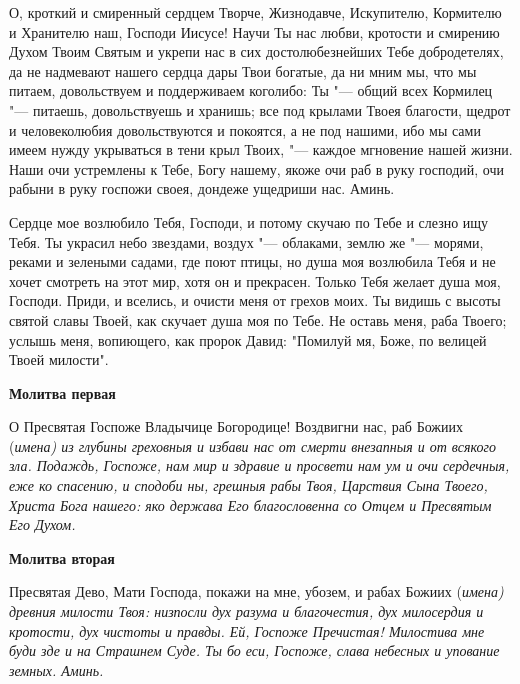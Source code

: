 О, кроткий и смиренный сердцем Творче, Жизнодавче, Искупителю, Кормителю и Хранителю наш, Господи Иисусе! Научи Ты нас любви, кротости и смирению Духом Твоим Святым и укрепи нас в сих достолюбезнейших Тебе добродетелях, да не надмевают нашего сердца дары Твои богатые, да ни мним мы, что мы питаем, довольствуем и поддерживаем коголибо: Ты "--- общий всех Кормилец "--- питаешь, довольствуешь и хранишь; все под крылами Твоея благости, щедрот и человеколюбия довольствуются и покоятся, а не под нашими, ибо мы сами имеем нужду укрываться в тени крыл Твоих, "--- каждое мгновение нашей жизни. Наши очи устремлены к Тебе, Богу нашему, якоже очи раб в руку господий, очи рабыни в руку госпожи своея, дондеже ущедриши нас. Аминь.


\mychapterending




Сердце мое возлюбило Тебя, Господи, и потому скучаю по Тебе и слезно ищу Тебя. Ты украсил небо звездами, воздух "--- облаками, землю же "--- морями, реками и зелеными садами, где поют птицы, но душа моя возлюбила Тебя и не хочет смотреть на этот мир, хотя он и прекрасен. Только Тебя желает душа моя, Господи. Приди, и вселись, и очисти меня от грехов моих. Ты видишь с высоты святой славы Твоей, как скучает душа моя по Тебе. Не оставь меня, раба Твоего; услышь меня, вопиющего, как пророк Давид: "Помилуй мя, Боже, по велицей Твоей милости".


\mychapterending




\bfseries Молитва первая\normalfont{}


О Пресвятая Госпоже Владычице Богородице! Воздвигни нас, раб Божиих (\itshape имена\normalfont{}) из глубины греховныя и избави нас от смерти внезапныя и от всякого зла. Подаждь, Госпоже, нам мир и здравие и просвети нам ум и очи сердечныя, еже ко спасению, и сподоби ны, грешныя рабы Твоя, Царствия Сына Твоего, Христа Бога нашего: яко держава Его благословенна со Отцем и Пресвятым Его Духом. 


\medskip


\bfseries Молитва вторая\normalfont{}


Пресвятая Дево, Мати Господа, покажи на мне, убозем, и рабах Божиих (\itshape имена\normalfont{}) древния милости Твоя: низпосли дух разума и благочестия, дух милосердия и кротости, дух чистоты и правды. Ей, Госпоже Пречистая! Милостива мне буди зде и на Страшнем Суде. Ты бо еси, Госпоже, слава небесных и упование земных. Аминь.


